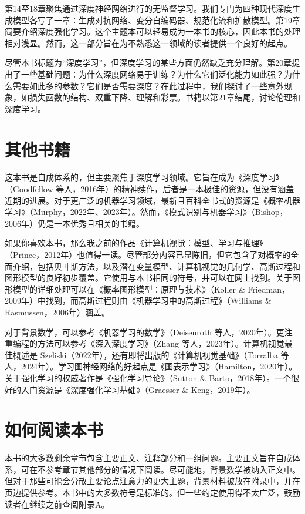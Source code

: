 \documentclass[lang=cn,newtx,10pt,scheme=chinese]{elegantbook}
\begin{document}
第14至18章聚焦通过深度神经网络进行的无监督学习。我们专门为四种现代深度生成模型各写了一章：生成对抗网络、变分自编码器、规范化流和扩散模型。第19章简要介绍深度强化学习。这个主题本可以轻易成为一本书的核心，因此本书的处理相对浅显。然而，这一部分旨在为不熟悉这一领域的读者提供一个良好的起点。

尽管本书标题为“深度学习”，但深度学习的某些方面仍然缺乏充分理解。第20章提出了一些基础问题：为什么深度网络易于训练？为什么它们泛化能力如此强？为什么需要如此多的参数？它们是否需要深度？在此过程中，我们探讨了一些意外现象，如损失函数的结构、双重下降、理解和彩票。书籍以第21章结尾，讨论伦理和深度学习。

\section{其他书籍}

这本书是自成体系的，但主要聚焦于深度学习领域。它旨在成为《深度学习》（Goodfellow 等人，2016年）的精神续作，后者是一本极佳的资源，但没有涵盖近期的进展。对于更广泛的机器学习领域，最新且百科全书式的资源是《概率机器学习》（Murphy，2022年、2023年）。然而，《模式识别与机器学习》（Bishop，2006年）仍是一本优秀且相关的书籍。

如果你喜欢本书，那么我之前的作品《计算机视觉：模型、学习与推理》（Prince，2012年）也值得一读。尽管部分内容已显陈旧，但它包含了对概率的全面介绍，包括贝叶斯方法，以及潜在变量模型、计算机视觉的几何学、高斯过程和图形模型的良好初步覆盖。它使用与本书相同的符号，并可以在网上找到。关于图形模型的详细处理可以在《概率图形模型：原理与技术》（Koller \& Friedman，2009年）中找到，而高斯过程则由《机器学习中的高斯过程》（Williams \& Rasmussen，2006年）涵盖。

对于背景数学，可以参考《机器学习的数学》（Deisenroth 等人，2020年）。更注重编程的方法可以参考《深入深度学习》（Zhang 等人，2023年）。计算机视觉最佳概述是 Szeliski（2022年），还有即将出版的《计算机视觉基础》（Torralba 等人，2024年）。学习图神经网络的好起点是《图表示学习》（Hamilton，2020年）。关于强化学习的权威著作是《强化学习导论》（Sutton \& Barto，2018年）。一个很好的入门资源是《深度强化学习基础》（Graesser \& Keng，2019年）。

\section{如何阅读本书}

本书的大多数剩余章节包含主要正文、注释部分和一组问题。主要正文旨在自成体系，可在不参考章节其他部分的情况下阅读。尽可能地，背景数学被纳入正文中。但对于那些可能会分散主要论点注意力的更大主题，背景材料被放在附录中，并在页边提供参考。本书中的大多数符号是标准的。但一些约定使用得不太广泛，鼓励读者在继续之前查阅附录A。
\end{document}
